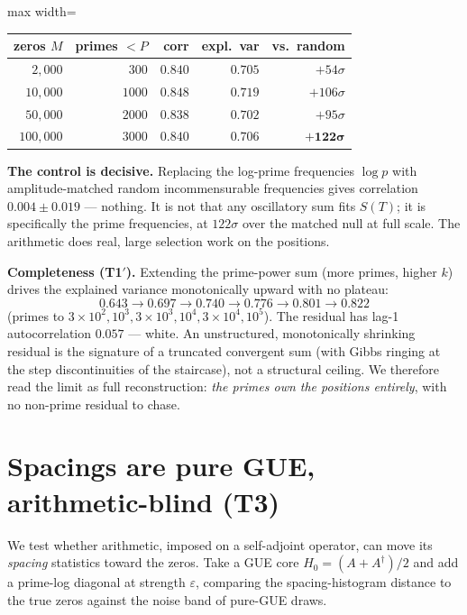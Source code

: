 \documentclass[11pt]{article}
\begin{document}
\begin{center}
\begin{adjustbox}{max width=\linewidth}\begin{tabular}{rrrrr}
\toprule
zeros $M$ & primes $<P$ & corr & expl.\ var & vs.\ random \\
\midrule
$2{,}000$ & $300$ & $0.840$ & $0.705$ & $+54\sigma$ \\
$10{,}000$ & $1000$ & $0.848$ & $0.719$ & $+106\sigma$ \\
$50{,}000$ & $2000$ & $0.838$ & $0.702$ & $+95\sigma$ \\
$100{,}000$ & $3000$ & $0.840$ & $0.706$ & $\mathbf{+122\sigma}$ \\
\bottomrule
\end{tabular}\end{adjustbox}
\end{center}

\textbf{The control is decisive.} Replacing the log-prime frequencies $\log p$ with amplitude-matched random incommensurable frequencies gives correlation $0.004\pm0.019$ --- nothing. It is not that any oscillatory sum fits $S(T)$; it is specifically the prime frequencies, at $122\sigma$ over the matched null at full scale. The arithmetic does real, large selection work on the positions.

\textbf{Completeness (T1$'$).} Extending the prime-power sum (more primes, higher $k$) drives the explained variance monotonically upward with no plateau:
\[
0.643 \to 0.697 \to 0.740 \to 0.776 \to 0.801 \to 0.822
\]
(primes to $3\times10^2,10^3,3\times10^3,10^4,3\times10^4,10^5$). The residual has lag-1 autocorrelation $0.057$ --- white. An unstructured, monotonically shrinking residual is the signature of a truncated convergent sum (with Gibbs ringing at the step discontinuities of the staircase), not a structural ceiling. We therefore read the limit as full reconstruction: \emph{the primes own the positions entirely}, with no non-prime residual to chase.

\section{Spacings are pure GUE, arithmetic-blind (T3)}

We test whether arithmetic, imposed on a self-adjoint operator, can move its \emph{spacing} statistics toward the zeros. Take a GUE core $H_0=(A+A^\dagger)/2$ and add a prime-log diagonal at strength $\varepsilon$, comparing the spacing-histogram distance to the true zeros against the noise band of pure-GUE draws.
\end{document}
